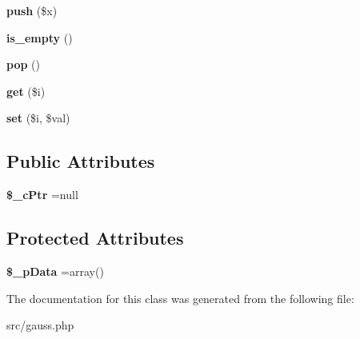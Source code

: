 \begin{DoxyCompactItemize}
\item 
\hypertarget{class_double_double_vector_a4a16d0c7145c7840e7e1f4318f868153}{{\bfseries push} (\$x)}\label{class_double_double_vector_a4a16d0c7145c7840e7e1f4318f868153}

\item 
\hypertarget{class_double_double_vector_ad60dfb15f1ad2f3c170752ae45caea34}{{\bfseries is\-\_\-empty} ()}\label{class_double_double_vector_ad60dfb15f1ad2f3c170752ae45caea34}

\item 
\hypertarget{class_double_double_vector_a1cecb930b808bc43ef950ea3bdcd8dff}{{\bfseries pop} ()}\label{class_double_double_vector_a1cecb930b808bc43ef950ea3bdcd8dff}

\item 
\hypertarget{class_double_double_vector_a767e4d6df36a77ccfad1801a3e80cda4}{{\bfseries get} (\$i)}\label{class_double_double_vector_a767e4d6df36a77ccfad1801a3e80cda4}

\item 
\hypertarget{class_double_double_vector_abf3ea451a206a4ce7a04b2a6ca0db2fe}{{\bfseries set} (\$i, \$val)}\label{class_double_double_vector_abf3ea451a206a4ce7a04b2a6ca0db2fe}

\end{DoxyCompactItemize}
\subsection*{Public Attributes}
\begin{DoxyCompactItemize}
\item 
\hypertarget{class_double_double_vector_adc14910e5ba8b0872994b7515b9a74e7}{{\bfseries \$\-\_\-c\-Ptr} =null}\label{class_double_double_vector_adc14910e5ba8b0872994b7515b9a74e7}

\end{DoxyCompactItemize}
\subsection*{Protected Attributes}
\begin{DoxyCompactItemize}
\item 
\hypertarget{class_double_double_vector_acc6104ea29d1d464933ec0763bc87e11}{{\bfseries \$\-\_\-p\-Data} =array()}\label{class_double_double_vector_acc6104ea29d1d464933ec0763bc87e11}

\end{DoxyCompactItemize}


The documentation for this class was generated from the following file\-:\begin{DoxyCompactItemize}
\item 
src/gauss.\-php\end{DoxyCompactItemize}
